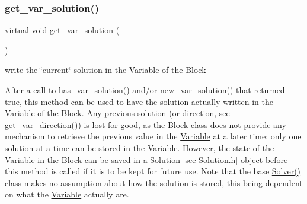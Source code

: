 \subsubsection{\texorpdfstring{get\+\_\+var\+\_\+solution()}{get\_var\_solution()}}
{\footnotesize\ttfamily virtual void get\+\_\+var\+\_\+solution (\begin{DoxyParamCaption}\item[{void}]{ }\end{DoxyParamCaption})\hspace{0.3cm}{\ttfamily [pure virtual]}}



write the \char`\"{}current\char`\"{} solution in the \mbox{\hyperlink{class_s_m_spp__di__unipi__it_1_1_variable}{Variable}} of the \mbox{\hyperlink{class_s_m_spp__di__unipi__it_1_1_block}{Block}} 

After a call to \mbox{\hyperlink{class_s_m_spp__di__unipi__it_1_1_solver_aa96263f4e0c59225f3f5d54f03fe31ee}{has\+\_\+var\+\_\+solution()}} and/or \mbox{\hyperlink{class_s_m_spp__di__unipi__it_1_1_solver_af109b504a566c90a4ea45c1574c128fe}{new\+\_\+var\+\_\+solution()}} that returned true, this method can be used to have the solution actually written in the \mbox{\hyperlink{class_s_m_spp__di__unipi__it_1_1_variable}{Variable}} of the \mbox{\hyperlink{class_s_m_spp__di__unipi__it_1_1_block}{Block}}. Any previous solution (or direction, see \mbox{\hyperlink{class_s_m_spp__di__unipi__it_1_1_solver_a4bc119810c0c2ee3ba0c48183f50aaf4}{get\+\_\+var\+\_\+direction()}}) is lost for good, as the \mbox{\hyperlink{class_s_m_spp__di__unipi__it_1_1_block}{Block}} class does not provide any mechanism to retrieve the previous value in the \mbox{\hyperlink{class_s_m_spp__di__unipi__it_1_1_variable}{Variable}} at a later time\+: only one solution at a time can be stored in the \mbox{\hyperlink{class_s_m_spp__di__unipi__it_1_1_variable}{Variable}}. However, the state of the \mbox{\hyperlink{class_s_m_spp__di__unipi__it_1_1_variable}{Variable}} in the \mbox{\hyperlink{class_s_m_spp__di__unipi__it_1_1_block}{Block}} can be saved in a \mbox{\hyperlink{class_s_m_spp__di__unipi__it_1_1_solution}{Solution}} \mbox{[}see \mbox{\hyperlink{_solution_8h}{Solution.\+h}}\mbox{]} object before this method is called if it is to be kept for future use. Note that the base \mbox{\hyperlink{class_s_m_spp__di__unipi__it_1_1_solver_a6a5e38de103dc5a46feb9bd4ac48c3d5}{Solver()}} class makes no assumption about how the solution is stored, this being dependent on what the \mbox{\hyperlink{class_s_m_spp__di__unipi__it_1_1_variable}{Variable}} actually are.

